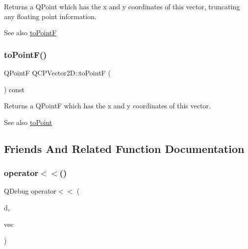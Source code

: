 Returns a Q\+Point which has the x and y coordinates of this vector, truncating any floating point information.

\begin{DoxySeeAlso}{See also}
\hyperlink{class_q_c_p_vector2_d_acd7af3f4a62833ada58be3f3021dbbac}{to\+PointF} 
\end{DoxySeeAlso}
\mbox{\label{class_q_c_p_vector2_d_acd7af3f4a62833ada58be3f3021dbbac}} 
\subsubsection{\texorpdfstring{to\+Point\+F()}{toPointF()}}
{\footnotesize\ttfamily Q\+PointF Q\+C\+P\+Vector2\+D\+::to\+PointF (\begin{DoxyParamCaption}{ }\end{DoxyParamCaption}) const\hspace{0.3cm}{\ttfamily [inline]}}

Returns a Q\+PointF which has the x and y coordinates of this vector.

\begin{DoxySeeAlso}{See also}
\hyperlink{class_q_c_p_vector2_d_add3edf75de9b7bf1abc693b973b2e906}{to\+Point} 
\end{DoxySeeAlso}


\subsection{Friends And Related Function Documentation}
\mbox{\label{class_q_c_p_vector2_d_a6c757af9671d925af4a36c2f58fb7234}} 
\subsubsection{\texorpdfstring{operator$<$$<$()}{operator<<()}}
{\footnotesize\ttfamily Q\+Debug operator$<$$<$ (\begin{DoxyParamCaption}\item[{Q\+Debug}]{d,  }\item[{const \hyperlink{class_q_c_p_vector2_d}{Q\+C\+P\+Vector2D} \&}]{vec }\end{DoxyParamCaption})\hspace{0.3cm}{\ttfamily [related]}}

